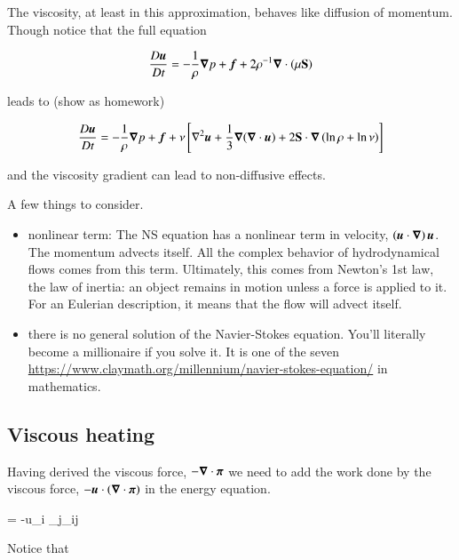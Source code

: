 The viscosity, at least in this approximation, behaves like diffusion
of momentum.  Though notice that the full equation


\begin{equation}
\frac{D {\boldsymbol{u}}}{D t}  = -\frac{1}{\rho}{\boldsymbol{\nabla}}{p} +{\boldsymbol{f}} +2\rho^{-1}{\boldsymbol{\nabla}}\cdot{\left(\mu\boldsymbol{\mathrm{S}} \right)}
 \end{equation}

\noindent  leads to (show as homework)

\begin{equation}
\frac{D {\boldsymbol{u}}}{D t}  = -\frac{1}{\rho}{\boldsymbol{\nabla}}{p} +{\boldsymbol{f}} + \nu
\left[\nabla^2 {\boldsymbol{u}} +\frac{1}{3}{\boldsymbol{\nabla}}{\left({\boldsymbol{\nabla}}\cdot{{\boldsymbol{u}}}\right)} + 2\boldsymbol{\mathrm{S}}\cdot{\boldsymbol{\nabla}}\left(\ln\rho+\ln\nu\right)\right]
 \end{equation}

\noindent and the viscosity gradient can lead to non-diffusive effects. 
 
A few things to consider.

\begin{itemize}
  
\item nonlinear term: The NS equation has a nonlinear term in
  velocity, $\left({\boldsymbol{u}}\cdot{\boldsymbol{\nabla}}\right){\boldsymbol{u}}$. The momentum advects
  itself. All the complex behavior of hydrodynamical flows comes from this term. Ultimately,
  this comes from Newton's 1st law, the law of inertia: an object
  remains in motion unless a force is applied to it. For an Eulerian
  description, it means that the flow will advect itself.

\item there is no general solution of the Navier-Stokes
  equation. You'll literally become a millionaire if you solve it. It
  is one of the seven
  \href{Millennium Prize
    problems}{https://www.claymath.org/millennium/navier-stokes-equation/}
  in mathematics. 

 \end{itemize}

 \subsection{Viscous heating}

 Having derived the viscous force, $-{\boldsymbol{\nabla}}\cdot{\boldsymbol{\mathrm{\pi}}}$ we need to add the work done by the
 viscous force,  $-{\boldsymbol{u}}\cdot\left({\boldsymbol{\nabla}}\cdot{\boldsymbol{\mathrm{\pi}}}\right)$ in the energy equation.

 \beq
{} = -u_i \partial_j\pi_{ij}
 \eeq

 Notice that

